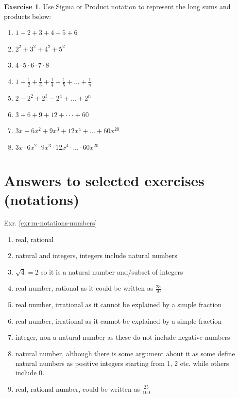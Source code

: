 \documentclass[
]{book}
\providecommand{\tightlist}{%
  \setlength{\itemsep}{0pt}\setlength{\parskip}{0pt}}
\theoremstyle{definition}
\theoremstyle{definition}
\theoremstyle{definition}
\newtheorem{exercise}{Exercise}[chapter]
\theoremstyle{remark}
\begin{document}
\begin{exercise}
\protect\hypertarget{exr:m-notations-sigma-product-reverse}{}{\label{exr:m-notations-sigma-product-reverse} }
Use Sigma or Product notation to represent the long sums and products below:

\begin{enumerate}
\def\labelenumi{\alph{enumi})}
\tightlist
\item
  \(1+2+3+4+5+6\)
\item
  \(2^2+3^2+4^2+5^2\)
\item
  \(4 \cdot 5 \cdot 6 \cdot 7 \cdot 8\)
\item
  \(1 + \frac{1}{2} + \frac{1}{3} + \frac{1}{4} + \frac{1}{5} +...+ \frac{1}{n}\)
\item
  \(2-2^2+2^3-2^4 + ...+2^n\)
\item
  \(3+6+9+12+···+60\)
\item
  \(3x + 6x^2 + 9x^3 + 12x^4 +...+60x^{20}\)
\item
  \(3x \cdot 6x^2 \cdot 9x^3 \cdot 12x^4 \cdot...\cdot 60x^{20}\)
\end{enumerate}
\end{exercise}

\hypertarget{answers-to-selected-exercises-notations}{%
\section*{Answers to selected exercises (notations)}\label{answers-to-selected-exercises-notations}}

Exr. \ref{exr:m-notations-numbers}

\begin{enumerate}
\def\labelenumi{\alph{enumi})}
\tightlist
\item
  real, rational
\item
  natural and integers, integers include natural numbers
\item
  \(\sqrt{4} = 2\) so it is a natural number and/subset of integers
\item
  real number, rational as it could be written as \(\frac{23}{10}\)
\item
  real number, irrational as it cannot be explained by a simple fraction
\item
  real number, irrational as it cannot be explained by a simple fraction
\item
  integer, non a natural number as these do not include negative numbers
\item
  natural number, although there is some argument about it as some define natural numbers as positive integers starting from 1, 2 etc. while others include 0.
\item
  real, rational number, could be written as \(\frac{25}{100}\)
\end{enumerate}
\end{document}

